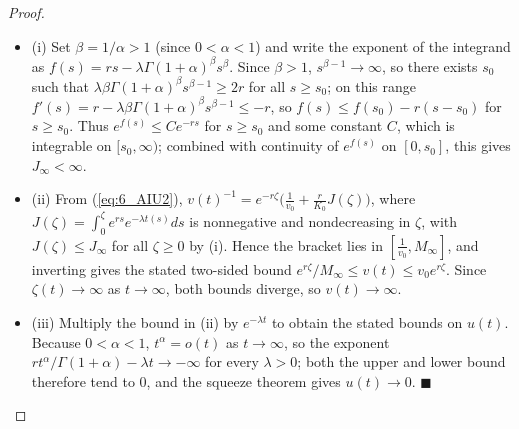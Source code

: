 \documentclass[10pt,a4paper]{amsart}
\begin{document}
\begin{proof}
\begin{itemize}
\item[] (i) Set $\beta=1/\alpha>1$ (since $0<\alpha<1$) and write the exponent of the integrand as $f(s)=rs-\lambda\Gamma(1+\alpha)^{\beta}s^{\beta}$. Since $\beta>1$, $s^{\beta-1}\to\infty$, so there exists $s_0$ such that $\lambda\beta\Gamma(1+\alpha)^{\beta}s^{\beta-1}\ge 2r$ for all $s\ge s_0$; on this range $f'(s)=r-\lambda\beta\Gamma(1+\alpha)^\beta s^{\beta-1}\le -r$, so $f(s)\le f(s_0)-r(s-s_0)$ for $s\ge s_0$. Thus $e^{f(s)}\le C e^{-rs}$ for $s\ge s_0$ and some constant $C$, which is integrable on $[s_0,\infty)$; combined with continuity of $e^{f(s)}$ on $[0,s_0]$, this gives $J_\infty<\infty$.


\item[] (ii) From (\ref{eq:6_AIU2}), $v(t)^{-1}=e^{-r\zeta}\big(\tfrac{1}{v_0}+\tfrac{r}{K_0}J(\zeta)\big)$, where $J(\zeta)=\int_0^\zeta e^{rs}e^{-\lambda t(s)}ds$ is nonnegative and nondecreasing in $\zeta$, with $J(\zeta)\le J_\infty$ for all $\zeta\ge0$ by (i). Hence the bracket lies in $[\tfrac1{v_0},M_\infty]$, and inverting gives the stated two-sided bound $e^{r\zeta}/M_\infty\le v(t)\le v_0 e^{r\zeta}$. Since $\zeta(t)\to\infty$ as $t\to\infty$, both bounds diverge, so $v(t)\to\infty$.


\item[] (iii) Multiply the bound in (ii) by $e^{-\lambda t}$ to obtain the stated bounds on $u(t)$. Because $0<\alpha<1$, $t^\alpha=o(t)$ as $t\to\infty$, so the exponent $rt^\alpha/\Gamma(1+\alpha)-\lambda t\to-\infty$ for every $\lambda>0$; both the upper and lower bound therefore tend to $0$, and the squeeze theorem gives $u(t)\to 0$. $\blacksquare$


\end{itemize}
\end{proof}
\end{document}
